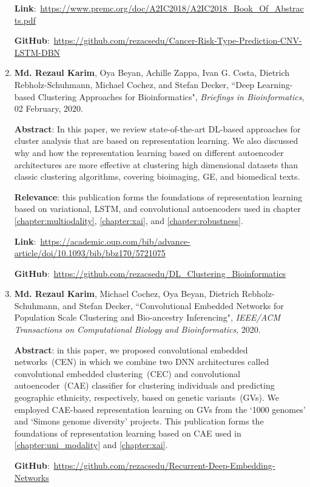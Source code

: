 \begin{enumerate}
	\textbf{Link}:~\url{https://www.premc.org/doc/A2IC2018/A2IC2018_Book_Of_Abstracts.pdf}
	
	\textbf{GitHub}:~\url{https://github.com/rezacsedu/Cancer-Risk-Type-Prediction-CNV-LSTM-DBN}
	
	\item \textbf{Md. Rezaul Karim}, Oya Beyan, Achille Zappa, Ivan G. Costa, Dietrich Rebholz-Schuhmann, Michael Cochez, and Stefan Decker, ``Deep Learning-based Clustering Approaches for Bioinformatics", \emph{Briefings in Bioinformatics}, 02 February, 2020.
	
	\textbf{Abstract}: In this paper, we review state-of-the-art DL-based approaches for cluster analysis that are based on representation learning. We also discussed why and how the representation learning based on different autoencoder architectures are more effective at clustering high dimensional datasets than classic clustering algorithms, covering bioimaging, GE, and biomedical texts. 
	
	\textbf{Relevance}: this publication forms the foundations of representation learning based on variational, LSTM, and convolutional autoencoders used in chapter \ref{chapter:multiodality}, \ref{chapter:xai}, and \ref{chapter:robustness}.

	\textbf{Link}:~\url{https://academic.oup.com/bib/advance-article/doi/10.1093/bib/bbz170/5721075}
	
	\textbf{GitHub}:~\url{https://github.com/rezacsedu/DL_Clustering_Bioinformatics}
	
	\item \textbf{Md. Rezaul Karim}, Michael Cochez, Oya Beyan, Dietrich Rebholz-Schuhmann, and Stefan Decker, ``Convolutional Embedded Networks for Population Scale Clustering and Bio-ancestry Inferencing", \emph{IEEE/ACM Transactions on Computational Biology and Bioinformatics}, 2020.
	
	\textbf{Abstract}: in this paper, we proposed convolutional embedded networks~(CEN) in which we combine two DNN architectures called convolutional embedded clustering~(CEC) and convolutional autoencoder~(CAE) classifier for clustering individuals and predicting geographic ethnicity, respectively, based on genetic variants~(GVs). We employed CAE-based representation learning on GVs from the `1000 genomes' and `Simons genome diversity' projects. This publication forms the foundations of representation learning based on CAE used in \cref{chapter:uni_modality} and \cref{chapter:xai}.

	\textbf{GitHub}:~\url{https://github.com/rezacsedu/Recurrent-Deep-Embedding-Networks}
	

\end{enumerate}
